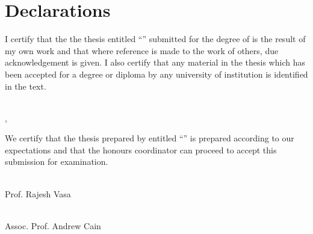 \newpage
\chapter*{Declarations}

I certify that the the thesis entitled ``\thetitle{}'' submitted for the degree of \thedegree{} is the result of my own work and that where reference is made to the work of others, due acknowledgement is given. I also certify that any material in the thesis which has been accepted for a degree or diploma by any university of institution is identified in the text.

\vspace{2cm}

\noindent
\hspace{\fill}
\parbox[b]{0.4\linewidth}{\hrulefill \\ \raggedleft \theauthor{}, \theauthorspostnominals{} \\ \thedate}

\vspace{3cm}
\noindent
We certify that the thesis prepared by \theauthor{} entitled ``\thetitle{}'' is prepared according to our expectations and that the honours coordinator can proceed to accept this submission for examination.

\vspace{2cm}

\noindent
\hspace{\fill}
\parbox[b]{0.4\linewidth}{\hrulefill \\ \raggedleft Prof. Rajesh Vasa \\ \thedate}
\hspace{1em}
\parbox[b]{0.4\linewidth}{\hrulefill \\ \raggedleft Assoc. Prof. Andrew Cain \\ \thedate}